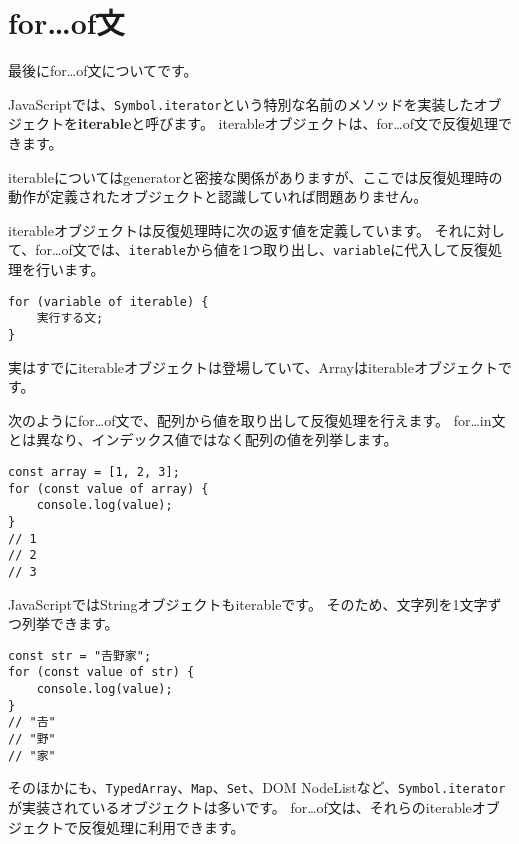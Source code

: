 \hypertarget{for-of-statement}{%
\section[for\ldots{}of文]{for\ldots{}of文\protect{}}\label{for-of-statement}}

最後にfor\ldots{}of文についてです。

JavaScriptでは、\texttt{Symbol.iterator}という特別な名前のメソッドを実装したオブジェクトを\textbf{iterable}と呼びます。
iterableオブジェクトは、for\ldots{}of文で反復処理できます。

iterableについてはgeneratorと密接な関係がありますが、ここでは反復処理時の動作が定義されたオブジェクトと認識していれば問題ありません。

iterableオブジェクトは反復処理時に次の返す値を定義しています。
それに対して、for\ldots{}of文では、\texttt{iterable}から値を1つ取り出し、\texttt{variable}に代入して反復処理を行います。

\begin{lstlisting}
for (variable of iterable) {
    実行する文;
}
\end{lstlisting}

実はすでにiterableオブジェクトは登場していて、Arrayはiterableオブジェクトです。

次のようにfor\ldots{}of文で、配列から値を取り出して反復処理を行えます。
for\ldots{}in文とは異なり、インデックス値ではなく配列の値を列挙します。

\begin{lstlisting}
const array = [1, 2, 3];
for (const value of array) {
    console.log(value);
}
// 1
// 2
// 3
\end{lstlisting}

JavaScriptではStringオブジェクトもiterableです。
そのため、文字列を1文字ずつ列挙できます。

\begin{lstlisting}
const str = "𠮷野家";
for (const value of str) {
    console.log(value);
}
// "𠮷"
// "野"
// "家"
\end{lstlisting}

そのほかにも、\texttt{TypedArray}、\texttt{Map}、\texttt{Set}、DOM
NodeListなど、\texttt{Symbol.iterator}が実装されているオブジェクトは多いです。
for\ldots{}of文は、それらのiterableオブジェクトで反復処理に利用できます。

